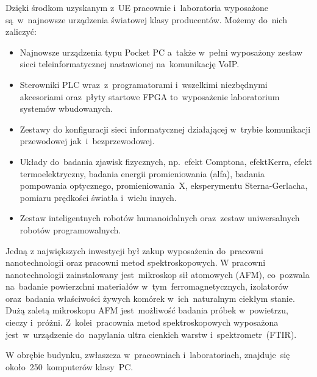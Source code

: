 ﻿\documentclass[a4paper,12pt]{article}
\begin{document}
Dzięki środkom uzyskanym z~UE pracownie i~laboratoria wyposażone są~w~najnowsze urządzenia światowej klasy producentów. Możemy do~nich zaliczyć:
\begin{itemize}
	\item Najnowsze urządzenia typu Pocket PC a~także w~pełni wyposażony zestaw sieci teleinformatycznej nastawionej na~komunikację VoIP.
	\item Sterowniki PLC wraz~z~programatorami i~wszelkimi niezbędnymi akcesoriami oraz~płyty startowe FPGA to~wyposażenie laboratorium systemów wbudowanych.
	\item Zestawy do konfiguracji sieci informatycznej działającej w~trybie komunikacji przewodowej jak~i~bezprzewodowej.
	\item Układy do~badania zjawisk fizycznych, np.~efekt Comptona, efekt\linebreak Kerra, efekt termoelektryczny, badania energii promieniowania (alfa), badania pompowania optycznego, promieniowania~X, eksperymentu Sterna-Gerlacha, pomiaru prędkości światła i~wielu innych.
	\item Zestaw inteligentnych robotów humanoidalnych oraz~zestaw uniwersalnych robotów programowalnych.
\end{itemize}

Jedną z największych inwestycji był zakup wyposażenia do~pracowni nanotechnologii oraz pracowni metod spektroskopowych. W pracowni nanotechnologii zainstalowany jest~mikroskop sił atomowych (AFM), co~pozwala na~badanie powierzchni materiałów w~tym~ferromagnetycznych, izolatorów oraz~badania właściwości żywych komórek w~ich~naturalnym ciekłym stanie. Dużą zaletą mikroskopu AFM jest~możliwość badania
próbek w~powietrzu, cieczy i~próżni. Z~kolei~pracownia metod spektroskopowych wyposażona jest~w~urządzenie do~napylania ultra cienkich warstw i~spektrometr~(FTIR).

W obrębie budynku, zwłaszcza w~pracowniach i~laboratoriach, znajduje~się około~250~komputerów klasy~PC. 
\end{document}
